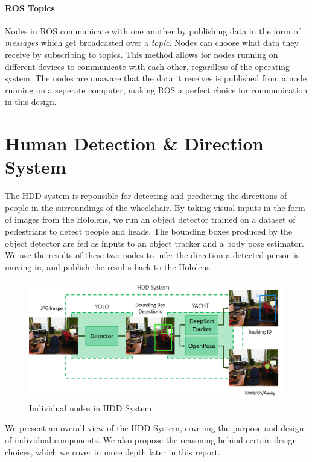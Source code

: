 \paragraph{ROS Topics} Nodes in ROS communicate with one another by publishing data in the form of \textit{messages} which get broadcasted over a \textit{topic}. Nodes can choose what data they receive by subscribing to topics. This method allows for nodes running on different devices to communicate with each other, regardless of the operating system. The nodes are unaware that the data it receives is published from a node running on a seperate computer, making ROS a perfect choice for communication in this design.

\section{Human Detection \& Direction System}
The HDD system is reponsible for detecting and predicting the directions of people in the surroundings of the wheelchair. By taking visual inputs in the form of images from the Hololens, we run an object detector trained on a dataset of pedestrians to detect people and heads. The bounding boxes produced by the object detector are fed as inputs to an object tracker and a body pose estimator. We use the results of these two nodes to infer the direction a detected person is moving in, and publish the results back to the Hololens.

\begin{figure}[ht]
	\centering
	\includegraphics[width=1.0\linewidth]{img/chapter4_analysis/hddSystemDiagram.png}
	\caption{Individual nodes in HDD System}
	\label{fig:detailedHDD}
\end{figure}

We present an overall view of the HDD System, covering the purpose and design of individual components. We also propose the reasoning behind certain design choices, which we cover in more depth later in this report.

